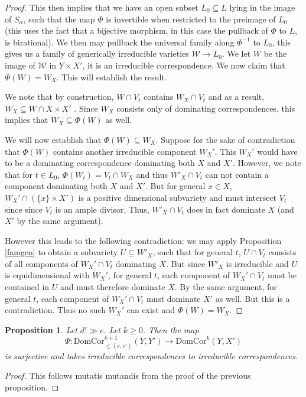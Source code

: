\documentclass[12pt]{amsart}
\numberwithin{equation}{section}
\newtheorem{proposition}[theorem]{Proposition}
\numberwithin{theorem}{section}
\theoremstyle{definition}
\theoremstyle{definition}
\def \DC{{\mathrm{DomCor}}}
\begin{document}
\begin{proof}
    This then implies that we have an open subset $L_0 \subseteq L$ lying in the image of $S_{\alpha}$,  such that the map $\Phi$ is invertible when restricted to the preimage of $L_0$ (this uses the fact that a bijective morphism, in this case the pullback of $\Phi$ to $L$, is birational).
    We then may pullback the universal family along $\Phi^{-1}$ to $L_0$, this gives us a family of generically irreducible varieties  $\mathcal{W} \to L_0$.
    We let $W$ be the image of $\mathcal{W}$ in $Y \times X'$, it is an irreducible correspondence. We now claim that $\Phi(W) = W_X$. This will establish the result. 

    We note that  by construction, $W \cap V_t$ contains $W_X \cap V_t$ and as a result, $W_X \subseteq W 
\cap X \times X' $ . Since  $W_X$ consists only of dominating correspondences, this implies that $W_X \subseteq\Phi(W)$ as well.

     We will now establish that $\Phi(W) \subseteq W_X$. Suppose for the sake of contradiction that $\Phi(W)$ contains another irreducible component $W_X'$. This $W_X'$ would have to be a dominating correspondence dominating both $X$ and $X'$.  
     However, we note that for $t \in L_0$, $\Phi(W_t) = V_t \cap W_X$ and thus $W'_X \cap V_t$ can not contain a component dominating both $X$ and $X'.$
    But for general $x \in X$, $W_X' \cap (\{x\} \times X')$ is a positive dimensional subvariety and must intersect $V_t$ since  since $V_t$  is an ample divisor, Thus,  $W'_X \cap V_t$ does in fact dominate $X$ (and $X'$  by the same argument).
     
    However this leads to the following contradiction: we may apply Proposition \ref{famgen} to obtain a subvariety $U \subseteq W'_X$, such that for general $t$, $U \cap V_t$ consists of all components of $W_X' \cap V_t$ dominating $X$. But since $W'_X$ is irreducible and $U$ is equidimensional with $W_X'$, for general $t$, each component of $W_X' \cap V_t$ must be contained in $U$ and must therefore dominate $X.$ By the same argument, for general $t$, each component of $W_X' \cap V_t$ must dominate $X'$ as well. But this is a contradiction. Thus no such $W_X'$ can exist and $\Phi(W) = W_X$.
      

\end{proof}


\begin{proposition}
   Let $d' \gg e.$ Let $k \ge 0$. Then the map $$\Psi: \DC^{k+1}_{\le (e,e')}(Y,Y') \to \DC^k(Y, X') $$ is surjective and takes irreducible correspondences to irreducible correspondences.
\end{proposition}
\begin{proof}
    This follows mutatis mutandis from the proof of the previous proposition.
\end{proof}
\end{document}
